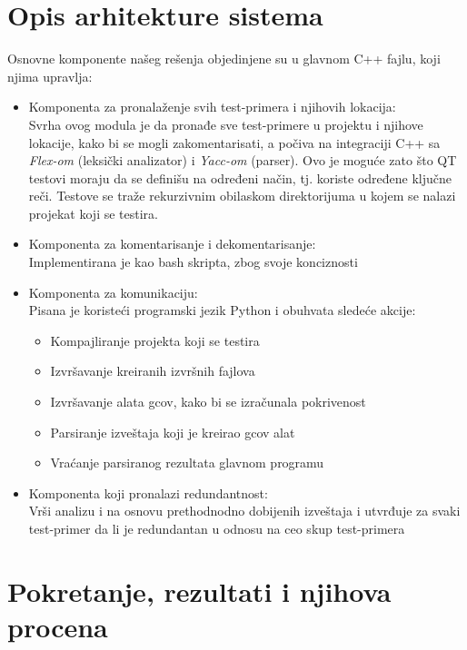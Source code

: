 \documentclass[a4paper]{article}
\begin{document}
\section{Opis arhitekture sistema}
\label{sec:arhitektura}

Osnovne komponente našeg rešenja objedinjene su u glavnom C++ fajlu, koji njima upravlja:
\begin{itemize}
    \item Komponenta za pronalaženje svih test-primera i njihovih lokacija:\\
            Svrha ovog modula je da pronađe sve test-primere u projektu i njihove lokacije, kako bi se mogli zakomentarisati, a počiva na integraciji C++ sa \textit{Flex-om} (leksički analizator) i \textit{Yacc-om} (parser). Ovo je moguće zato što QT testovi moraju da se definišu na određeni način, tj. koriste određene ključne reči. Testove se traže rekurzivnim obilaskom direktorijuma u kojem se nalazi projekat koji se testira.
    \item Komponenta za komentarisanje i dekomentarisanje:\\
            Implementirana je kao bash skripta, zbog svoje konciznosti
    \item Komponenta za komunikaciju:\\
            Pisana je koristeći programski jezik Python i obuhvata sledeće akcije:
            \begin{itemize}
                \item Kompajliranje projekta koji se testira
                \item Izvršavanje kreiranih izvršnih fajlova
                \item Izvršavanje alata gcov, kako bi se izračunala pokrivenost
                \item Parsiranje izveštaja koji je kreirao gcov alat
                \item Vraćanje parsiranog rezultata glavnom programu
            \end{itemize}
    \item Komponenta koji pronalazi redundantnost:\\
            Vrši analizu i na osnovu prethodnodno dobijenih izveštaja i utvrđuje za svaki test-primer da li je redundantan u odnosu na ceo skup test-primera
\end{itemize}

\section{Pokretanje, rezultati i njihova procena}
\label{sec:pokretanje_rezultati_procena}
\end{document}
